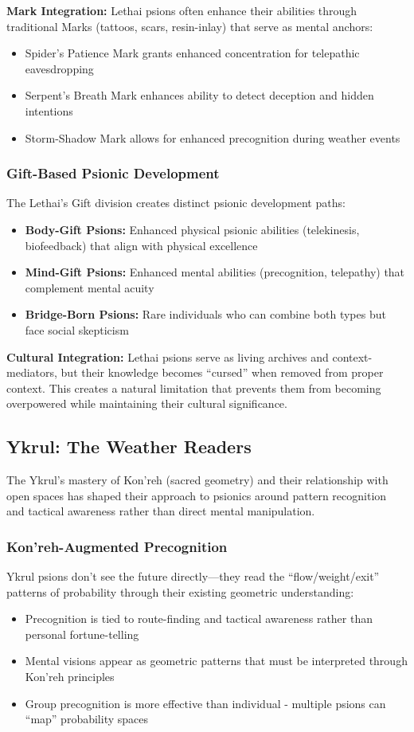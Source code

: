 \documentclass[11pt,twoside]{article}
\begin{document}
\textbf{Mark Integration:} Lethai psions often enhance their abilities through traditional Marks (tattoos, scars, resin-inlay) that serve as mental anchors:
\begin{itemize}
    \item Spider's Patience Mark grants enhanced concentration for telepathic eavesdropping
    \item Serpent's Breath Mark enhances ability to detect deception and hidden intentions
    \item Storm-Shadow Mark allows for enhanced precognition during weather events
\end{itemize}

\subsubsection{Gift-Based Psionic Development}
The Lethai's Gift division creates distinct psionic development paths:
\begin{itemize}
    \item \textbf{Body-Gift Psions:} Enhanced physical psionic abilities (telekinesis, biofeedback) that align with physical excellence
    \item \textbf{Mind-Gift Psions:} Enhanced mental abilities (precognition, telepathy) that complement mental acuity
    \item \textbf{Bridge-Born Psions:} Rare individuals who can combine both types but face social skepticism
\end{itemize}

\textbf{Cultural Integration:} Lethai psions serve as living archives and context-mediators, but their knowledge becomes ``cursed'' when removed from proper context. This creates a natural limitation that prevents them from becoming overpowered while maintaining their cultural significance.

\subsection{Ykrul: The Weather Readers}

The Ykrul's mastery of Kon'reh (sacred geometry) and their relationship with open spaces has shaped their approach to psionics around pattern recognition and tactical awareness rather than direct mental manipulation.

\subsubsection{Kon'reh-Augmented Precognition}
Ykrul psions don't see the future directly---they read the ``flow/weight/exit'' patterns of probability through their existing geometric understanding:
\begin{itemize}
    \item Precognition is tied to route-finding and tactical awareness rather than personal fortune-telling
    \item Mental visions appear as geometric patterns that must be interpreted through Kon'reh principles
    \item Group precognition is more effective than individual - multiple psions can ``map'' probability spaces
\end{itemize}
\end{document}
